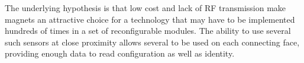The underlying hypothesis is that low cost and lack of RF transmission make magnets an attractive choice for a technology that may have to be implemented hundreds of times in a set of reconfigurable modules. The ability to use several such sensors at close proximity allows several to be used on each connecting face, providing enough data to read configuration as well as identity.